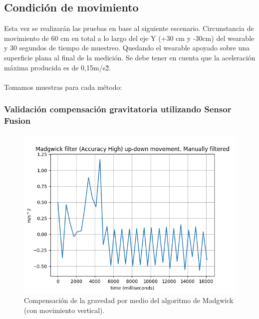 \subsection{Condición de movimiento}

Esta vez se realizarán las pruebas en base al siguiente escenario. Circunstancia de movimiento de 60 cm en total a lo largo del eje Y (+30 cm y -30cm) del wearable y 30 segundos de tiempo de muestreo. Quedando el wearable apoyado sobre una superficie plana al final de la medición. Se debe tener en cuenta que la aceleración máxima producida es de 0,15m/s\^2.\\\\ Tomamos muestras para cada método:

\subsubsection{Validación compensación gravitatoria utilizando Sensor Fusion}

\begin{figure}[H]
	\centering
	\includegraphics[scale=0.5]{imagenes/madwickup-down.png}
	\caption{Compensación de la gravedad por medio del algoritmo de Madgwick (con movimiento vertical).}
	\label{Movimiento vertical Madgwick}
\end{figure}


